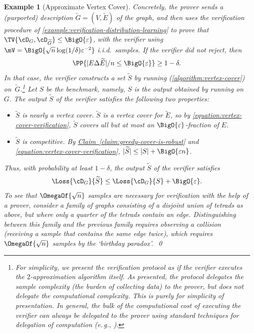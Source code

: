 \documentclass[11pt]{article}
\newcommand{\expref}[2]{\texorpdfstring{\hyperref[#2]{#1~\ref{#2}}}{#1~\ref{#2}}}
\newtheorem{example}[theorem]{Example}
\newcommand{\eg}{e.\,g.}
\begin{document}
\begin{example}[Approximate Vertex Cover]
	Concretely, the prover sends a (purported) description $\widetilde{G} = (V, \widetilde{E})$ of the graph, and then uses the verification procedure of \cref{example:verification-distribution-learning} to prove that $\TV{\cD_G,\cD_{\widetilde{G}}} \leq \BigO{\varepsilon}$, with the verifier using $\mV = \BigO{\sqrt{n}\log(1/\delta)\varepsilon^{-2}}$ i.i.d.\ samples.
	If the verifier did not reject, then 
	\begin{equation}
		\label{equation:vertex-cover-verification}
		\PP{|E \Delta \widetilde{E}|/n \leq \BigO{\varepsilon}} \geq 1-\delta.
	\end{equation}
	In that case, the verifier constructs a set $\widetilde{S}$ by running  (\cref{algorithm:vertex-cover}) on~$\widetilde{G}$.\footnote{%
	  For simplicity, we present the verification protocol as if the verifier executes the $2$-approximation algorithm itself. As presented, the protocol delegates the sample complexity (the burden of collecting data) to the prover, but does not delegate the computational complexity. This is purely for simplicity of presentation. In general, the bulk of the computational %
cost  %
of executing the verifier can always be delegated to the prover using standard techniques for delegation of computation (\eg, \cite{DBLP:journals/jacm/GoldwasserKR15}).%
	}
	Let $S$ be the benchmark, namely, $S$ is the output obtained by running  on~$G$.
	The output $\widetilde{S}$ of the verifier satisfies the following two properties:
	\begin{itemize}
		\item{
			\emph{$\widetilde{S}$ is nearly a vertex cover}. $\widetilde{S}$ is a vertex cover for $\widetilde{E}$, so by \cref{equation:vertex-cover-verification}, $\widetilde{S}$ covers all but at most an $\BigO{\varepsilon}$-fraction of $E$.
		}
		\item{
			\emph{$\widetilde{S}$ is competitive}. By \expref{Claim}{claim:greedy-cover-is-robust} and \cref{equation:vertex-cover-verification}, $|\widetilde{S}| \leq |S| + \BigO{\varepsilon n}$.
		}
	\end{itemize}
	Thus, with probability at least $1-\delta$, the output $\widetilde{S}$ of the verifier satisfies
	\[
		\Loss{\cD_G}{\widetilde{S}} \leq \Loss{\cD_G}{S} + \BigO{\varepsilon}.
	\]
	To see that $\OmegaOf{\sqrt{n}}$ samples are necessary for verification with the help of a prover, consider a family of graphs consisting of a disjoint union of tetrads as above, but where only a quarter of the tetrads contain an edge. Distinguishing between this family and the previous family requires observing a collision (receiving a sample that contains the same edge twice), which requires $\OmegaOf{\sqrt{n}}$ samples by the `birthday paradox'.~\qed
\end{example}
\end{document}
